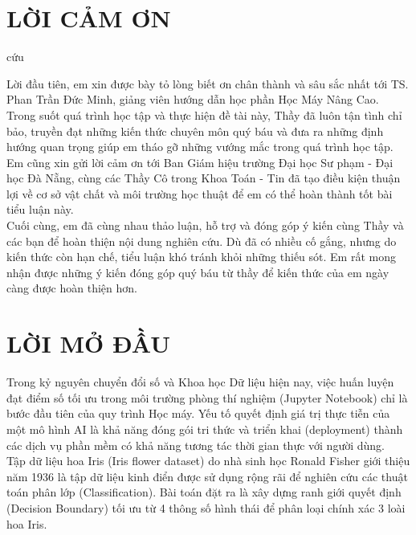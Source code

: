 \documentclass[14pt]{extarticle}
\begin{document}
		\section*{LỜI CẢM ƠN}
cứu
		
		Lời đầu tiên, em xin được bày tỏ lòng biết ơn chân thành và sâu sắc nhất tới TS. Phan Trần Đức Minh, giảng viên hướng dẫn học phần Học Máy Nâng Cao. Trong suốt quá trình học tập và thực hiện đề tài này, Thầy đã luôn tận tình chỉ bảo, truyền đạt những kiến thức chuyên môn quý báu và đưa ra những định hướng quan trọng giúp em tháo gỡ những vướng mắc trong quá trình học tập.\\
		
		\noindent Em cũng xin gửi lời cảm ơn tới Ban Giám hiệu trường Đại học Sư phạm - Đại học Đà Nẵng, cùng các Thầy Cô trong Khoa Toán - Tin đã tạo điều kiện thuận lợi về cơ sở vật chất và môi trường học thuật để em có thể hoàn thành tốt bài tiểu luận này.\\
		
		\noindent Cuối cùng, em đã cùng nhau thảo luận, hỗ trợ và đóng góp ý kiến cùng Thầy và các bạn để hoàn thiện nội dung nghiên cứu. Dù đã có nhiều cố gắng, nhưng do kiến thức còn hạn chế, tiểu luận khó tránh khỏi những thiếu sót. Em rất mong nhận được những ý kiến đóng góp quý báu từ thầy để kiến thức của em ngày càng được hoàn thiện hơn.
	
		\newpage
		\section*{LỜI MỞ ĐẦU}
		\vspace{1.em}
		
		Trong kỷ nguyên chuyển đổi số và Khoa học Dữ liệu hiện nay, việc huấn luyện đạt điểm số tối ưu trong môi trường phòng thí nghiệm (Jupyter Notebook) chỉ là bước đầu tiên của quy trình Học máy. Yếu tố quyết định giá trị thực tiễn của một mô hình AI là khả năng đóng gói tri thức và triển khai (deployment) thành các dịch vụ phần mềm có khả năng tương tác thời gian thực với người dùng.\\  
		
		\noindent Tập dữ liệu hoa Iris (Iris flower dataset) do nhà sinh học Ronald Fisher giới thiệu năm 1936 là tập dữ liệu kinh điển được sử dụng rộng rãi để nghiên cứu các thuật toán phân lớp (Classification). Bài toán đặt ra là xây dựng ranh giới quyết định (Decision Boundary) tối ưu từ 4 thông số hình thái để phân loại chính xác 3 loài hoa Iris.\\
		
\end{document}
